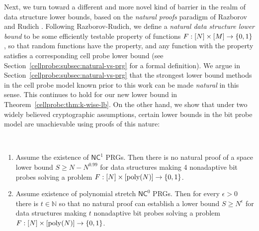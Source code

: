 Next, we turn toward a different and more novel kind of barrier in the realm of data structure lower bounds, based on the \emph{natural proofs} paradigm of Razborov and Rudich \cite{natural-proofs}. Following Razborov-Rudich, we define a \emph{natural data structure lower bound} to be some efficiently testable property of functions $F:[N] \times [M] \to \{0,1\}$, so that random functions have the property, and any function with the property satisfies a corresponding cell probe lower bound (see Section~\ref{cellprobe:subsec:natural-vs-prg} for a formal definition).
We argue in Section~\ref{cellprobe:subsec:natural-vs-prg} that the strongest lower bound methods in the cell probe model known prior to this work can be made \emph{natural} in this sense. This continues to hold for our new lower bound in Theorem~\ref{cellprobe:thm:k-wise-lb}.
On the other hand, we show that under two widely believed cryptographic assumptions, certain lower bounds in the bit probe model are unachievable using proofs of this nature:
\begin{theorem}

~
\begin{enumerate}
    \item Assume the existence of $\mathsf{NC}^1$ PRGs. Then there is no natural proof of a space lower bound $S \geq N - N^{0.99}$ for data structures making 4 nonadaptive bit probes solving a problem $F: [N] \times [\mathrm{poly}(N)] \to \{0,1\}$.
    \item Assume existence of polynomial stretch $\mathsf{NC}^0$ PRGs. Then for every $\epsilon>0$ there is $t \in \mathbb{N}$ so that no natural proof can establish a lower bound $S \geq N^{\epsilon}$ for data structures making $t$ nonadaptive bit probes solving a problem $F: [N] \times [\mathrm{poly}(N)] \to \{0,1\}$.
\end{enumerate}
\end{theorem}
